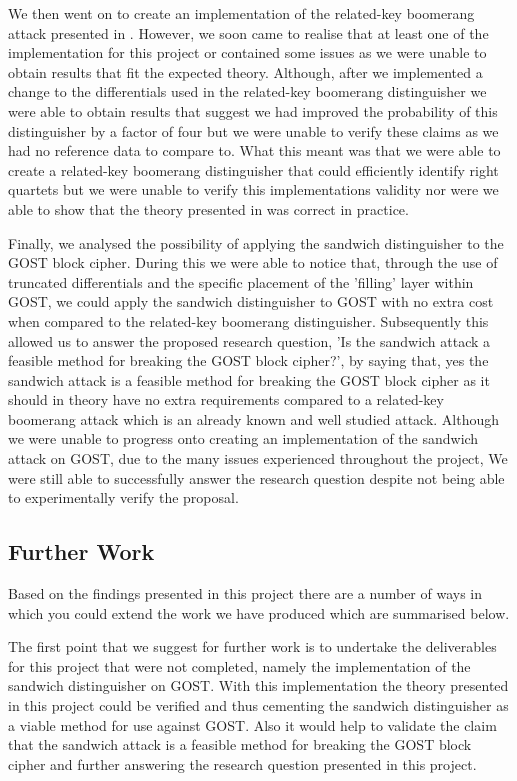 \documentclass[10pt,journal,compsoc]{IEEEtran}
\begin{document}
We then went on to create an implementation of the related-key boomerang attack presented in \cite{cryptoeprint:2010/111}. However, we soon came to realise that at least one of the implementation for this project or \cite{cryptoeprint:2010/111} contained some issues as we were unable to obtain results that fit the expected theory. Although, after we implemented a change to the differentials used in the related-key boomerang distinguisher we were able to obtain results that suggest we had improved the probability of this distinguisher by a factor of four but we were unable to verify these claims as we had no reference data to compare to. What this meant was that we were able to create a related-key boomerang distinguisher that could efficiently identify right quartets but we were unable to verify this implementations validity nor were we able to show that the theory presented in \cite{jofc-2014-25962} was correct in practice.

Finally, we analysed the possibility of applying the sandwich distinguisher to the GOST block cipher. During this we were able to notice that, through the use of truncated differentials and the specific placement of the 'filling' layer within GOST, we could apply the sandwich distinguisher to GOST with no extra cost when compared to the related-key boomerang distinguisher. Subsequently this allowed us to answer the proposed research question, 'Is the sandwich attack a feasible method for breaking the GOST block cipher?', by saying that, yes the sandwich attack is a feasible method for breaking the GOST block cipher as it should in theory have no extra requirements compared to a related-key boomerang attack which is an already known and well studied attack. Although we were unable to progress onto creating an implementation of the sandwich attack on GOST, due to the many issues experienced throughout the project, We were still able to successfully answer the research question despite not being able to experimentally verify the proposal.

\subsection{Further Work}
Based on the findings presented in this project there are a number of ways in which you could extend the work we have produced which are summarised below. 

The first point that we suggest for further work is to undertake the deliverables for this project that were not completed, namely the implementation of the sandwich distinguisher on GOST. With this implementation the theory presented in this project could be verified and thus cementing the sandwich distinguisher as a viable method for use against GOST. Also it would help to validate the claim that the sandwich attack is a feasible method for breaking the GOST block cipher and further answering the research question presented in this project.
\end{document}
